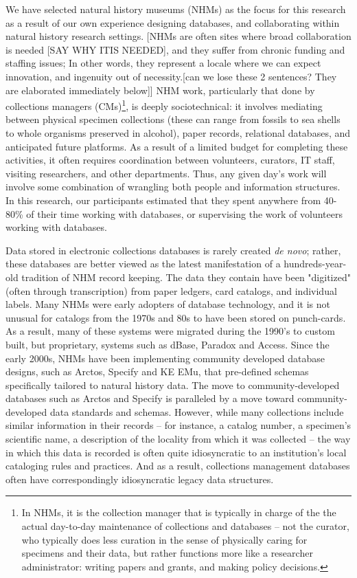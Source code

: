 We have selected natural history museums (NHMs) as the focus for this research as a result of our own experience designing databases, and collaborating within natural history research settings. [NHMs are often sites where broad collaboration is needed [SAY WHY ITIS NEEDED], and they suffer from chronic funding and staffing issues; In other words, they represent a locale where we can expect innovation, and ingenuity out of necessity.[can we lose these 2 sentences? They are elaborated immediately below]] NHM work, particularly that done by collections managers (CMs)\footnote{In NHMs, it is the collection manager that is typically in charge of the the actual day-to-day maintenance of collections and databases -- not the curator, who typically does less curation in the sense of physically caring for specimens and their data, but rather functions more like a researcher administrator: writing papers and grants, and making policy decisions.}, is deeply sociotechnical: it involves mediating between physical specimen collections (these can range from fossils to sea shells to whole organisms preserved in alcohol), paper records, relational databases, and anticipated future platforms. As a result of a limited budget for completing these activities, it often requires coordination between volunteers, curators, IT staff, visiting researchers, and other departments. Thus, any given day’s work will involve some combination of wrangling both people and information structures. In this research, our participants estimated that they spent anywhere from 40-80\% of their time working with databases, or supervising the work of volunteers working with databases.

Data stored in electronic collections databases is rarely created \textit{de novo}; rather, these databases are better viewed as the latest manifestation of a hundreds-year-old tradition of NHM record keeping. The data they contain have been "digitized" (often through transcription) from paper ledgers, card catalogs, and individual labels. Many NHMs were early adopters of database technology, and it is not unusual for catalogs from the 1970s and 80s to have been stored on punch-cards. As a result, many of these systems were migrated during the 1990's to custom built, but proprietary, systems such as dBase, Paradox and Access. Since the early 2000s, NHMs have been implementing community developed database designs, such as Arctos, Specify and KE EMu, that pre-defined schemas specifically tailored to natural history data. The move to community-developed databases such as Arctos and Specify is paralleled by a move toward community-developed data standards and schemas.  However, while many collections include similar information in their records – for instance, a catalog number, a specimen’s scientific name, a description of the locality from which it was collected – the way in which this data is recorded is often quite idiosyncratic to an institution’s local cataloging rules and practices. And as a result, collections management databases often have correspondingly idiosyncratic legacy data structures.

